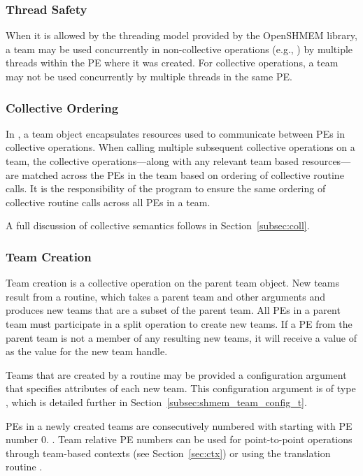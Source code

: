 \subsubsection*{Thread Safety}

When it is allowed by the threading model provided by the OpenSHMEM
library, a team may be used concurrently in non-collective operations
(e.g., ) by multiple threads within the
\ac{PE} where it was created.
For collective operations, a team may not be used concurrently by
multiple threads in the same \ac{PE}.

\subsubsection*{Collective Ordering}

In \openshmem, a team object encapsulates resources used to communicate
between \acp{PE} in collective operations. When calling multiple subsequent
collective operations on a team, the collective operations---along with any
relevant team based resources---are matched across the \acp{PE} in the team
based on ordering of collective routine calls. It is the responsibility
of the \openshmem program to ensure the same ordering of collective routine calls
across all \acp{PE} in a team.

A full discussion of collective semantics follows in Section~\ref{subsec:coll}.

\subsubsection*{Team Creation}

Team creation is a collective operation on the parent team object. New teams
result from a  routine, which takes a parent team
and other arguments and produces new teams that are a subset of the parent
team. All \acp{PE} in a parent team must participate in a split operation
to create new teams. If a \ac{PE} from the parent team is not a member of any
resulting new teams, it will receive a value of 
as the value for the new team handle.

Teams that are created by a  routine may be
provided a configuration argument that specifies attributes of each new team.
This configuration argument is of type , which
is detailed further in Section~\ref{subsec:shmem_team_config_t}.

\acp{PE} in a newly created teams are consecutively numbered with starting with
\ac{PE} number 0. . Team relative \ac{PE}
numbers can be used for point-to-point operations through team-based
contexts (see Section~\ref{sec:ctx}) or using the translation routine
.

